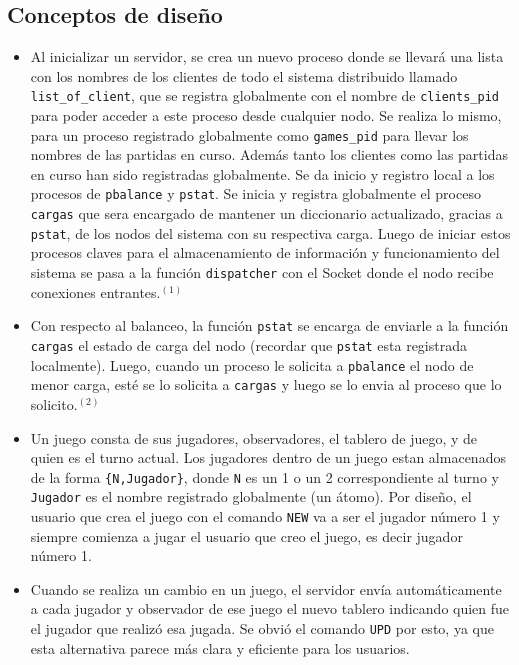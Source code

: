 \documentclass[a4paper]{article}
\newcommand{\blacktr}[0]{\item[$\blacktriangleright$]}
\begin{document}
\subsection*{Conceptos de diseño}
\begin{itemize}
  \blacktr Al inicializar un servidor, se crea un nuevo proceso donde se llevará una lista con los nombres de los clientes de todo el sistema distribuido llamado \texttt{list_of_client}, que se registra globalmente con el nombre de \texttt{clients_pid} para poder acceder a este proceso desde cualquier nodo. Se realiza lo mismo, para un proceso registrado globalmente como \texttt{games_pid} para llevar los nombres de las partidas en curso. Además tanto los clientes como las partidas en curso han sido registradas globalmente. Se da inicio y registro local a los procesos de \texttt{pbalance} y \texttt{pstat}. Se inicia y registra globalmente el proceso \texttt{cargas} que sera encargado de mantener un diccionario actualizado, gracias a \texttt{pstat}, de los nodos del sistema con su respectiva carga. Luego de iniciar estos procesos claves para el almacenamiento de información y funcionamiento del sistema se pasa a la función \texttt{dispatcher} con el Socket donde el nodo recibe conexiones entrantes.$^{(1)}$

  \blacktr Con respecto al balanceo, la función \texttt{pstat} se encarga de enviarle a la función \texttt{cargas} el estado de carga del nodo (recordar que \texttt{pstat} esta registrada localmente). Luego, cuando un proceso le solicita a \texttt{pbalance} el nodo de menor carga, esté se lo solicita a \texttt{cargas} y luego se lo envia al proceso que lo solicito.$^{(2)}$ 

  \blacktr Un juego consta de sus jugadores, observadores, el tablero de juego, y de quien es el turno actual. Los jugadores dentro de un juego estan almacenados de la forma \texttt{\{N,Jugador\}}, donde \texttt{N} es un 1 o un 2 correspondiente al turno y \texttt{Jugador} es el nombre registrado globalmente (un átomo). Por diseño, el usuario que crea el juego con el comando \texttt{NEW} va a ser el jugador número 1 y siempre comienza a jugar el usuario que creo el juego, es decir jugador número 1.

  \blacktr Cuando se realiza un cambio en un juego, el servidor envía automáticamente a cada jugador y observador de ese juego el nuevo tablero indicando quien fue el jugador que realizó esa jugada. Se obvió el comando \texttt{UPD} por esto, ya que esta alternativa parece más clara y eficiente para los usuarios. 
\end{itemize}
\end{document}
